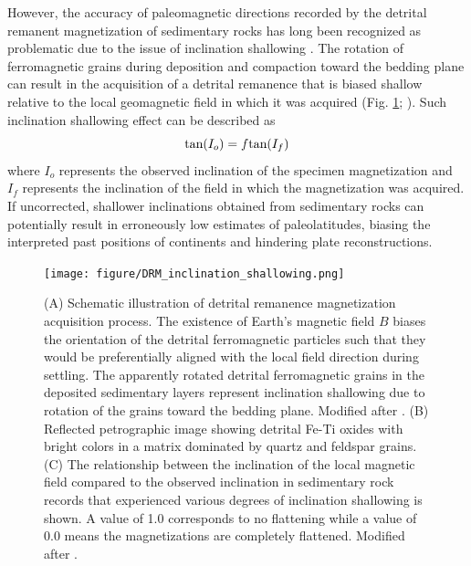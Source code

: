 However, the accuracy of paleomagnetic directions recorded by the detrital remanent magnetization of sedimentary rocks has long been recognized as problematic due to the issue of inclination shallowing \citep[e.g.][]{King1955a, Kodama2012a, Tauxe1984a, Van-Andel1966a}. The rotation of ferromagnetic grains during deposition and compaction toward the bedding plane can result in the acquisition of a detrital remanence that is biased shallow relative to the local geomagnetic field in which it was acquired (Fig. \ref{fig:DRM_inclination_shallowing}; \citealp{Tauxe2005a}). Such inclination shallowing effect can be described as 
\begin{equation*}
\textup{tan}(I_o) = f\textup{tan}(I_f)
\end{equation*}
where $I_o$ represents the observed inclination of the specimen magnetization and $I_f$ represents the inclination of the field in which the magnetization was acquired. If uncorrected, shallower inclinations obtained from sedimentary rocks can potentially result in erroneously low estimates of paleolatitudes, biasing the interpreted past positions of continents and hindering plate reconstructions.

\begin{figure}[h]
    \centering
    \texttt{[image: figure/DRM\_inclination\_shallowing.png]}
    \caption[The inclination shallowing problem in detrital remanence magnetization]{(A) Schematic illustration of detrital remanence magnetization acquisition process. The existence of Earth's magnetic field $B$ biases the orientation of the detrital ferromagnetic particles such that they would be preferentially aligned with the local field direction during settling. The apparently rotated detrital ferromagnetic grains in the deposited sedimentary layers represent inclination shallowing due to rotation of the grains toward the bedding plane. Modified after \cite{Tauxe1993a}. (B) Reflected petrographic image showing detrital Fe-Ti oxides with bright colors in a matrix dominated by quartz and feldspar grains. (C) The relationship between the inclination of the local magnetic field compared to the observed inclination in sedimentary rock records that experienced various degrees of inclination shallowing is shown. A value of 1.0 corresponds to no flattening while a value of 0.0 means the magnetizations are completely flattened. Modified after \cite{Pierce2022a}.}
    \label{fig:DRM_inclination_shallowing}
\end{figure}

